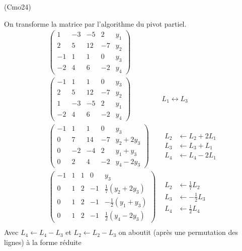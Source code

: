 \begin{tiny}(Cmo24)\end{tiny} On transforme la matrice par l'algorithme du pivot partiel.
\begin{align*}
  &\begin{pmatrix}
    1  & -3 & -5 & 2  & y_1 \\
    2  & 5  & 12 & -7 & y_2 \\
    -1 & 1  & 1  & 0  & y_3 \\
    -2 & 4  & 6  & -2 & y_4
  \end{pmatrix}& \\
  &\begin{pmatrix}
    -1 & 1  & 1  & 0  & y_3 \\
    2  & 5  & 12 & -7 & y_2 \\
     1 & -3 & -5 & 2  & y_1 \\
    -2 & 4  & 6  & -2 & y_4
  \end{pmatrix}& L_1 \leftrightarrow L_3 \\
  &\begin{pmatrix}
    -1 & 1  & 1  & 0  & y_3 \\
    0  & 7  & 14 & -7 & y_2 + 2y_3\\
    0  & -2 & -4 & 2  & y_1 + y_3\\
    0  & 2  & 4  & -2 & y_4 - 2y_3
  \end{pmatrix}& 
  \begin{aligned}
    L_2 &\leftarrow L_2 + 2L_1 \\
    L_3 &\leftarrow L_3 + L_1 \\
    L_4 &\leftarrow L_4 - 2L_1
  \end{aligned}\\
  &\begin{pmatrix}
    -1 & 1  & 1  & 0  & y_3 \\
    0  & 1  & 2 & -1 & \frac{1}{7}(y_2 + 2y_3)\\
    0  & 1  & 2 & -1  & -\frac{1}{2}( y_1 + y_3)\\
    0  & 1  & 2  & -1 & \frac{1}{2}( y_4 - 2y_3)
  \end{pmatrix}& 
  \begin{aligned}
    L_2 &\leftarrow \frac{1}{7}L_2 \\
    L_3 &\leftarrow -\frac{1}{2}L_3 \\
    L_4 &\leftarrow \frac{1}{2}L_4
  \end{aligned}\\
\end{align*}
Avec $L_4 \leftarrow L_4 - L_3$ et $L_2 \leftarrow L_2 - L_3$ on aboutit (après une permutation des lignes) à la forme réduite
